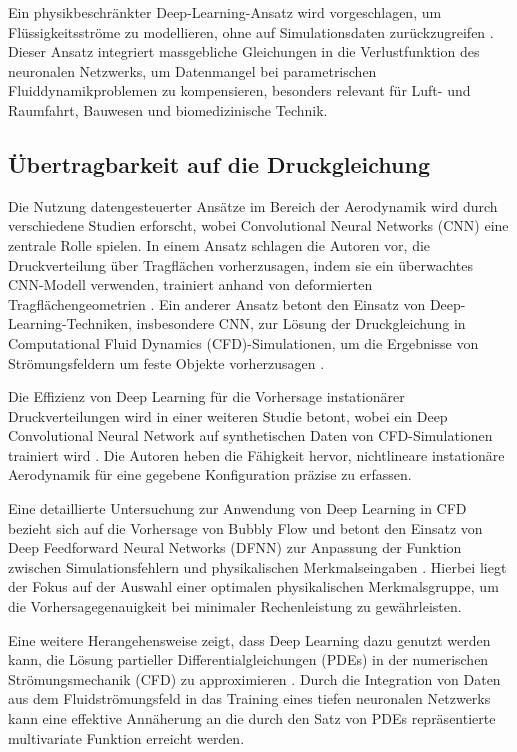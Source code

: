 Ein physikbeschränkter Deep-Learning-Ansatz wird vorgeschlagen, um Flüssigkeitsströme zu modellieren, ohne auf Simulationsdaten zurückzugreifen \parencite{sunSurrogateModelingFluid2020a}. Dieser Ansatz integriert massgebliche Gleichungen in die Verlustfunktion des neuronalen Netzwerks, um Datenmangel bei parametrischen Fluiddynamikproblemen zu kompensieren, besonders relevant für Luft- und Raumfahrt, Bauwesen und biomedizinische Technik.

\subsection{Übertragbarkeit auf die Druckgleichung}
Die Nutzung datengesteuerter Ansätze im Bereich der Aerodynamik wird durch verschiedene Studien erforscht, wobei Convolutional Neural Networks (CNN) eine zentrale Rolle spielen. In einem Ansatz schlagen die Autoren vor, die Druckverteilung über Tragflächen vorherzusagen, indem sie ein überwachtes CNN-Modell verwenden, trainiert anhand von deformierten Tragflächengeometrien \parencite{huiFastPressureDistribution2020}. Ein anderer Ansatz betont den Einsatz von Deep-Learning-Techniken, insbesondere CNN, zur Lösung der Druckgleichung in Computational Fluid Dynamics (CFD)-Simulationen, um die Ergebnisse von Strömungsfeldern um feste Objekte vorherzusagen \parencite{abucide-armasDataAugmentationBasedTechnique2021}.

Die Effizienz von Deep Learning für die Vorhersage instationärer Druckverteilungen wird in einer weiteren Studie betont, wobei ein Deep Convolutional Neural Network auf synthetischen Daten von CFD-Simulationen trainiert wird \parencite{rozovDatadrivenPredictionUnsteady2021}. Die Autoren heben die Fähigkeit hervor, nichtlineare instationäre Aerodynamik für eine gegebene Konfiguration präzise zu erfassen.

Eine detaillierte Untersuchung zur Anwendung von Deep Learning in CFD bezieht sich auf die Vorhersage von Bubbly Flow und betont den Einsatz von Deep Feedforward Neural Networks (DFNN) zur Anpassung der Funktion zwischen Simulationsfehlern und physikalischen Merkmalseingaben \parencite{baoComputationallyEfficientCFD2020}. Hierbei liegt der Fokus auf der Auswahl einer optimalen physikalischen Merkmalsgruppe, um die Vorhersagegenauigkeit bei minimaler Rechenleistung zu gewährleisten.

Eine weitere Herangehensweise zeigt, dass Deep Learning dazu genutzt werden kann, die Lösung partieller Differentialgleichungen (PDEs) in der numerischen Strömungsmechanik (CFD) zu approximieren \parencite{josephMeshBasedNeural2022}. Durch die Integration von Daten aus dem Fluidströmungsfeld in das Training eines tiefen neuronalen Netzwerks kann eine effektive Annäherung an die durch den Satz von PDEs repräsentierte multivariate Funktion erreicht werden.